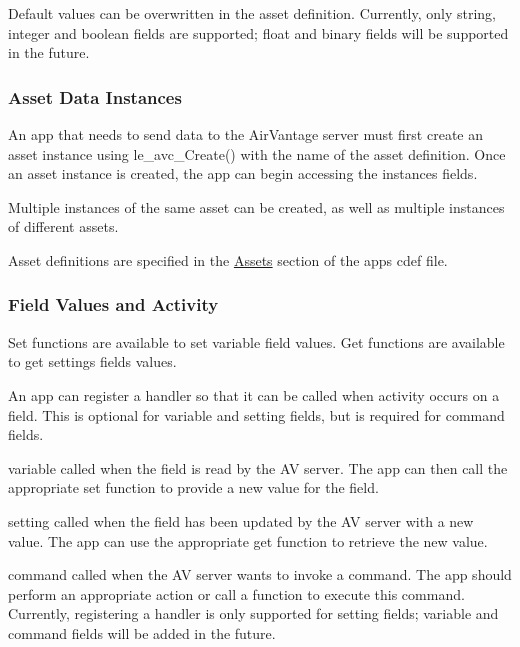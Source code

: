 Default values can be overwritten in the asset definition. Currently, only string, integer and boolean fields are supported; float and binary fields will be supported in the future.\hypertarget{c_le_avdata_le_avdata_instance}{}\subsubsection{Asset Data Instances}\label{c_le_avdata_le_avdata_instance}
An app that needs to send data to the Air\+Vantage server must first create an asset instance using le\+\_\+avc\+\_\+\+Create() with the name of the asset definition. Once an asset instance is created, the app can begin accessing the instance\textquotesingle{}s fields.

Multiple instances of the same asset can be created, as well as multiple instances of different assets.

Asset definitions are specified in the \hyperlink{def_files_cdef_defFilesCdef_assets}{Assets} section of the app\textquotesingle{}s {\ttfamily cdef} file.\hypertarget{c_le_avdata_le_avdata_field}{}\subsubsection{Field Values and Activity}\label{c_le_avdata_le_avdata_field}
Set functions are available to set variable field values. Get functions are available to get settings fields\textquotesingle{} values.

An app can register a handler so that it can be called when activity occurs on a field. This is optional for variable and setting fields, but is required for command fields.
\begin{DoxyItemize}
\item {\ttfamily variable} called when the field is read by the A\+V server. The app can then call the appropriate set function to provide a new value for the field.
\item {\ttfamily setting} called when the field has been updated by the A\+V server with a new value. The app can use the appropriate get function to retrieve the new value.
\item {\ttfamily command} called when the A\+V server wants to invoke a command. The app should perform an appropriate action or call a function to execute this command. Currently, registering a handler is only supported for setting fields; variable and command fields will be added in the future.
\end{DoxyItemize}

